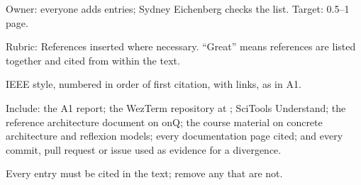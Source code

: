\begin{requirements}
  \item Owner: everyone adds entries; Sydney Eichenberg checks the list. Target: 0.5--1 page.
  \item Rubric: References inserted where necessary. ``Great'' means references are listed together and cited from within the text.
  \item IEEE style, numbered in order of first citation, with links, as in A1.
  \item Include: the A1 report; the WezTerm repository at \pinnedcommit; SciTools Understand; the reference architecture document on onQ; the course material on concrete architecture and reflexion models; every documentation page cited; and every commit, pull request or issue used as evidence for a divergence.
  \item Every entry must be cited in the text; remove any that are not.
\end{requirements}

